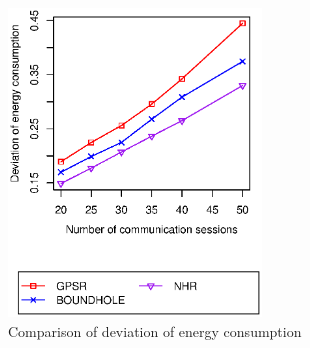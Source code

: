 \begin{figure}[!htb]
  \centering
  \captionsetup{justification=centering}
  \includegraphics[width=0.6\textwidth]{Chapter7/Chapter7Figs/dev.eps}
\caption{Comparison of deviation of energy consumption}
\end{figure}

